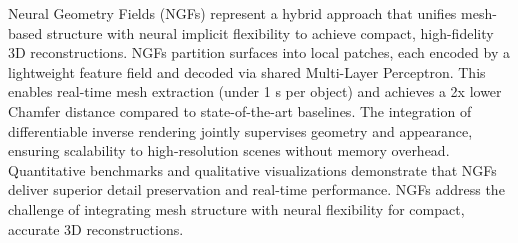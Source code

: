 Neural Geometry Fields (NGFs) represent a hybrid approach that unifies mesh-based structure with neural implicit flexibility to achieve compact, high-fidelity 3D reconstructions.  
NGFs partition surfaces into local patches, each encoded by a lightweight feature field and decoded via shared Multi-Layer Perceptron.  
This enables real-time mesh extraction (under 1 s per object) and achieves a 2x lower Chamfer distance compared to state-of-the-art baselines.  
The integration of differentiable inverse rendering jointly supervises geometry and appearance, ensuring scalability to high-resolution scenes without memory overhead.  
Quantitative benchmarks and qualitative visualizations demonstrate that NGFs deliver superior detail preservation and real-time performance.  
NGFs address the challenge of integrating mesh structure with neural flexibility for compact, accurate 3D reconstructions.